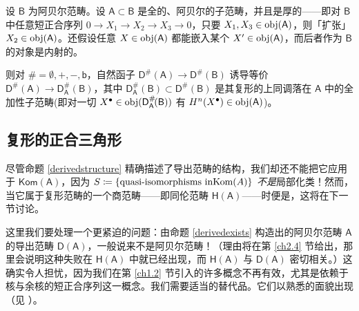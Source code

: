 \begin{Lem}\label{abeliansubcatderivedequiv}
	设 $\mathsf{B}$ 为阿贝尔范畴。设 $\mathsf{A}\subset\mathsf{B}$ 是全的、阿贝尔的子范畴，并且是\textup{厚}的——即对 $\mathsf{B}$ 中任意短正合序列 $0\rightarrow X_1\rightarrow X_2\rightarrow X_3\rightarrow 0$，只要 $X_1,X_3\in\textup{obj}(\mathsf{A})$，则「扩张」$X_2\in\textup{obj}(\mathsf{A})$。还假设任意 $X\in\textup{obj}(\mathsf{A})$ 都能嵌入某个 $X'\in\textup{obj}(\mathsf{A})$，而后者作为 $\mathsf{B}$ 的对象是内射的。
	
	则对 $\#=\emptyset, +, -, \mathsf{b}$，自然函子 $\mathsf{D^\#\!(A)}\rightarrow \mathsf{D^\#\!(B)}$ 诱导等价 $\mathsf{D^\#\!(A)}\rightarrow \mathsf{D_\mathsf{A}^\#\!(B)}$，其中 $\mathsf{D_\mathsf{A}^\#\!(B)}\subset \mathsf{D^\#\!(B)}$ 是其复形的上同调落在 $\mathsf{A}$ 中的全加性子范畴\textup{\big(}即对一切 $X^\bullet\in\textup{obj}(\mathsf{D_\mathsf{A}^\#\!(B)})$ 有 $H^n(X^\bullet)\in\textup{obj}(\mathsf{A})$\textup{\big)}。
\end{Lem}



\subsection{复形的正合三角形}\label{ch2.3}


尽管命题 \ref{derivedstructure} 精确描述了导出范畴的结构，我们却还不能把它应用于 $\mathsf{Kom(A)}$，因为 $S\coloneqq\{\text{quasi-isomorphisms in}\break\text{Kom}(A)\}$ \textit{不是}局部化类！然而，当它属于复形范畴的一个商范畴——即同伦范畴 $\mathsf{H(A)}$——时便是，这将在下一节讨论。 

这里我们要处理一个更紧迫的问题：由命题 \ref{derivedexists} 构造出的阿贝尔范畴 $\mathsf{A}$ 的导出范畴 $\mathsf{D(A)}$，一般说来不是阿贝尔范畴！（理由将在第 \ref{ch2.4} 节给出，那里会说明这种失败在 $\mathsf{H(A)}$ 中就已经出现，而 $\mathsf{H(A)}$ 与 $\mathsf{D(A)}$ 密切相关。）这确实令人担忧，因为我们在第 \ref{ch1.2} 节引入的许多概念不再有效，尤其是依赖于核与余核的短正合序列这一概念。我们需要适当的替代品。它们以熟悉的面貌出现（见 \cite[chapter 3]{[Imp21]}）。 

